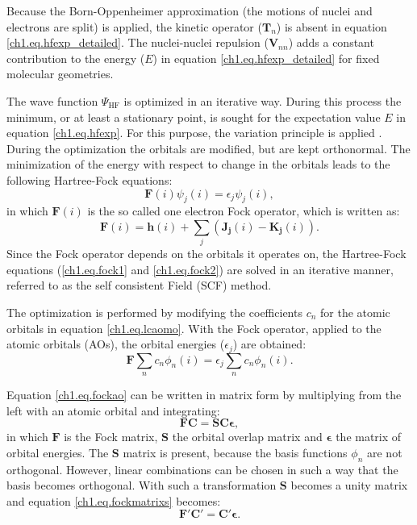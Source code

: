 Because the Born-Oppenheimer approximation (the motions of nuclei and electrons are split) is applied, the kinetic operator ($\mathbf{T}_{n}$) is absent in equation \ref{ch1.eq.hfexp_detailed}. The nuclei-nuclei repulsion ($\mathbf{V}_{nn}$) adds a constant contribution to the energy ($E$) in equation \ref{ch1.eq.hfexp_detailed} for fixed molecular geometries.

The wave function $\Psi_\mathrm{HF}$ is optimized in an iterative way. During this process the minimum, or at least a stationary point, is sought for the expectation value $E$ in equation \ref{ch1.eq.hfexp}. For this purpose, the variation principle is applied \cite{varia}. During the optimization the orbitals are modified, but are kept orthonormal. The minimization of the energy with respect to change in the orbitals leads to the following Hartree-Fock equations:
\begin{equation}
\mathbf{F}(i)\psi_j(i)=\epsilon_j \psi_j(i),
\label{ch1.eq.fock1}
\end{equation}
in which $\mathbf{F}(i)$ is the so called one electron Fock operator, which is written as:
\begin{equation}
\mathbf{F}(i)=\mathbf{h}(i) + \sum_j (\mathbf{J_j}(i) - \mathbf{K_j}(i)).
\label{ch1.eq.fock2}
\end{equation}
Since the Fock operator depends on the orbitals it operates on, the Hartree-Fock equations (\ref{ch1.eq.fock1} and \ref{ch1.eq.fock2}) are solved in an iterative manner, referred to as the self consistent Field (SCF) method.

The optimization is performed by modifying the coefficients $c_n$ for the atomic orbitals in equation \ref{ch1.eq.lcaomo}. With the Fock operator, applied to the atomic orbitals (AOs), the orbital energies ($\epsilon_j$) are obtained:
\begin{equation}
\mathbf{F}\sum_n c_n \phi_n (i) = \epsilon_j \sum_n c_n \phi_n (i).
\label{ch1.eq.fockao}
\end{equation}

Equation \ref{ch1.eq.fockao} can be written in matrix form by multiplying from the left with an atomic orbital and integrating:
\begin{equation}
\mathbf{F}\mathbf{C} = \mathbf{S}\mathbf{C}\mathbf{\epsilon},
\label{ch1.eq.fockmatrixs}
\end{equation}
in which $\mathbf{F}$ is the Fock matrix, $\mathbf{S}$ the orbital overlap matrix and $\mathbf{\epsilon}$ the matrix of orbital energies. The $\mathbf{S}$ matrix is present, because the basis functions $\phi_n$ are not orthogonal. However, linear combinations can be chosen in such a way that the basis becomes orthogonal. With such a transformation $\mathbf{S}$ becomes a unity matrix and equation \ref{ch1.eq.fockmatrixs} becomes:
\begin{equation}
\mathbf{F'}\mathbf{C'} = \mathbf{C'}\mathbf{\epsilon}.
\end{equation}

